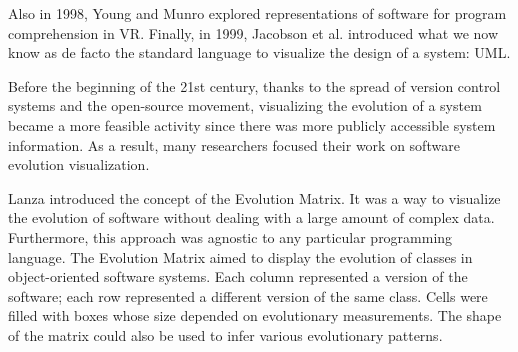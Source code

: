Also in 1998, Young and Munro \cite{Young1998} explored representations of software for program comprehension in VR. 
Finally, in 1999, Jacobson et al. \cite{Jacobson1999} introduced what we now know as de facto the standard language to visualize the design of a system: UML. 



Before the beginning of the 21st century, thanks to the spread of version control systems and the open-source movement, 
visualizing the evolution of a system became a more feasible activity since there was more publicly accessible system information.   
As a result, many researchers focused their work on software evolution visualization.

Lanza \cite{Lanza2001} introduced the concept of the Evolution Matrix. 
It was a way to visualize the evolution of software without dealing with a large amount of complex data. 
Furthermore, this approach was agnostic to any particular programming language. 
The Evolution Matrix aimed to display the evolution of classes in object-oriented software systems. 
Each column represented a version of the software; each row represented a different version of the same class.
Cells were filled with boxes whose size depended on evolutionary measurements. 
The shape of the matrix could also be used to infer various evolutionary patterns.

